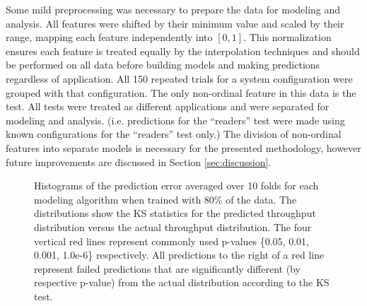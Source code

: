 \documentclass[letterpaper, 10 pt, conference]{ieeeconf}  %
\begin{document}
Some mild preprocessing was necessary to prepare the data for modeling and analysis. All features were shifted by their minimum value and scaled by their range, mapping each feature independently into $[0,1]$. This normalization ensures each feature is treated equally by the interpolation techniques and should be performed on all data before building models and making predictions regardless of application. All 150 repeated trials for a system configuration were grouped with that configuration. The only non-ordinal feature in this data is the test. All tests were treated as different applications and were separated for modeling and analysis. (i.e. predictions for the ``readers'' test were made using known configurations for the ``readers'' test only.) The division of non-ordinal features into separate models is necessary for the presented methodology, however future improvements are discussed in Section \ref{sec:discussion}.


\begin{figure}
  \caption{Histograms of the prediction error averaged over 10 folds for each modeling algorithm when trained with 80\% of the data. The distributions show the KS statistics for the predicted throughput distribution versus the actual throughput distribution. The four vertical red lines represent commonly used p-values \{0.05, 0.01, 0.001, 1.0e-6\} respectively. All predictions to the right of a red line represent failed predictions that are significantly different (by respective p-value) from the actual distribution according to the KS test.
  \vspace{-.1cm}}
  \label{fig:ks_histogram_80_20}
\end{figure}
\end{document}
